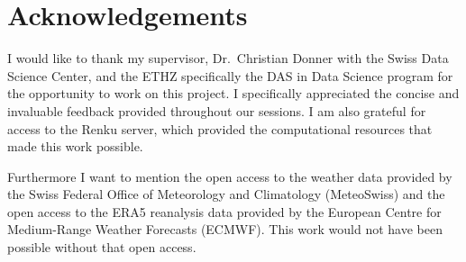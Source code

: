 \chapter*{Acknowledgements}

I would like to thank my supervisor, Dr.\ Christian Donner with the Swiss Data Science Center, and the ETHZ specifically the DAS in Data
Science program for the opportunity to work on this project. I specifically appreciated the concise and invaluable feedback provided throughout our sessions. I am also
grateful for access to the Renku server, which provided the computational
resources that made this work possible.

Furthermore I want to mention the open access to the weather data provided by the Swiss Federal Office of Meteorology and Climatology (MeteoSwiss) and the open access to the ERA5 reanalysis data provided by the European Centre for Medium-Range Weather Forecasts (ECMWF). This work would not have been possible without that open access.

